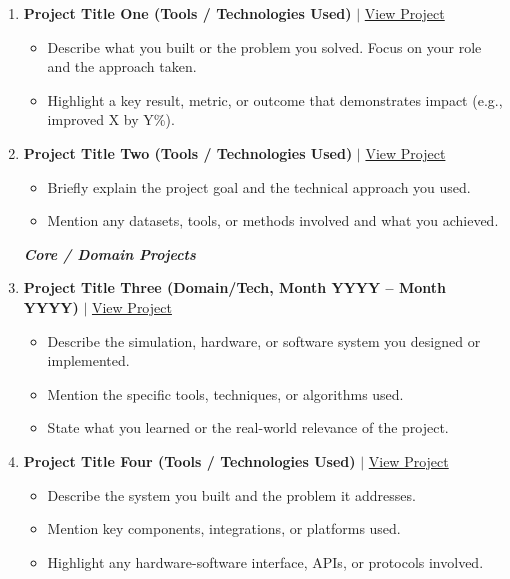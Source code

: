 \documentclass[a4paper,10pt]{article}
\begin{document}
\begin{enumerate}

\item \textbf{Project Title One (Tools / Technologies Used)} $|$ \href{https://github.com/}{View Project}
\begin{itemize}
    \item Describe what you built or the problem you solved. Focus on your role and the approach taken.
    \item Highlight a key result, metric, or outcome that demonstrates impact (e.g., improved X by Y\%).
\end{itemize}

\vspace{2pt}

\item \textbf{Project Title Two (Tools / Technologies Used)} $|$ \href{https://github.com/}{View Project}
\begin{itemize}
    \item Briefly explain the project goal and the technical approach you used.
    \item Mention any datasets, tools, or methods involved and what you achieved.
\end{itemize}

\vspace{4pt}
\begin{center}
    \textit{\textbf{Core / Domain Projects}}
\end{center}
\vspace{-2pt}

\item \textbf{Project Title Three (Domain/Tech, Month YYYY -- Month YYYY)} $|$ \href{https://github.com/}{View Project}
\begin{itemize}
    \item Describe the simulation, hardware, or software system you designed or implemented.
    \item Mention the specific tools, techniques, or algorithms used.
    \item State what you learned or the real-world relevance of the project.
\end{itemize}

\vspace{2pt}

\item \textbf{Project Title Four (Tools / Technologies Used)} $|$ \href{https://github.com/}{View Project}
\begin{itemize}
    \item Describe the system you built and the problem it addresses.
    \item Mention key components, integrations, or platforms used.
    \item Highlight any hardware-software interface, APIs, or protocols involved.
\end{itemize}

\end{enumerate}
\end{document}
